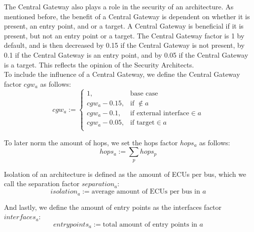 \hfill \break

The Central Gateway also plays a role in the security of an architecture.
As mentioned before, the benefit of a Central Gateway is dependent on whether it is present, an entry point, and or a target.
A Central Gateway is beneficial if it is present, but not an entry point or a target.
The Central Gateway factor is 1 by default, and is then decreased by 0.15 if the Central Gateway is not present,
by 0.1 if the Central Gateway is an entry point, and by 0.05 if the Central Gateway is a target.
This reflects the opinion of the Security Architects.\\
To include the influence of a Central Gateway, we define the Central Gateway factor $cgw_{a}$ as follows:\\
\begin{equation}
    cgw_{a} := 
    \begin{cases}
    1,&\text{base case}\\
    cgw_{a} - 0.15,&\text{if } \not\in a\\
    cgw_{a} - 0.1,&\text{if external interface} \in a\\
    cgw_{a} - 0.05,&\text{if target} \in a\\
    \end{cases} \label{eq:cgw}
\end{equation}

\hfill \break

To later norm the amount of hops, we set the hops factor $hops_{a}$ as follows:\\
\begin{equation}
    hops_{a} := \sum_{p} hops_{p} \label{eq:hops}
\end{equation}

\hfill \break

Isolation of an architecture is defined as the amount of ECUs per bus, which we call the separation factor $separation_{a}$:\\
\begin{equation}
    isolation_{a} := \text{average amount of ECUs per bus in } a \label{eq:isolation}
\end{equation}

\hfill \break

And lastly, we define the amount of entry points as the interfaces factor $interfaces_{a}$:\\
\begin{equation}
    entrypoints_{a} := \text{total amount of entry points in } a \label{eq:interfaces}
\end{equation}

